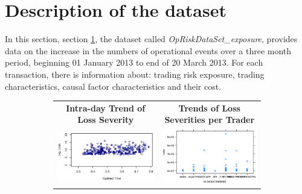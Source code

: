\documentclass{DissertateUSU}
\begin{document}
\section{Description of the dataset}
\label{sec:Description of the dataset}

In this section, section \ref{sec:Description of the dataset}, the
dataset called \emph{OpRiskDataSet\_exposure}, provides data on the
increase in the numbers of operational events over a three month period,
beginning 01 January 2013 to end of 20 March 2013. For each transaction,
there is information about: trading risk exposure, trading
characteristics, causal factor characteristics and their cost.

\begin{figure}
\begin{subfigure}[b]{0.55\textwidth}
   \begin{frame}
      \centering
       \begin{tabular}{cc}
        \textbf{Intra-day Trend of Loss Severity} & \textbf{Trends of Loss Severities per Trader} \\
        \includegraphics[width=7.5cm]{IntraDayUpdatedTime.eps}
         &
         \includegraphics[width=7cm]{TrendTraderId.eps}
         \end{tabular}
    \end{frame}
   \label{Intra_Day_Trends} 
\end{subfigure}


\end{figure}
\end{document}
